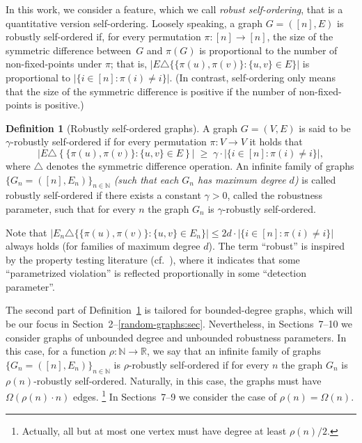 \documentclass[10pt,a4paper]{article}
\theoremstyle{definition}
\newtheorem{definition}[theorem]{Definition}
\newcommand{\N}{\mathbb N}
\newcommand{\R}{\mathbb R}
\newcommand{\BD}{\begin{definition}}   \newcommand{\ED}{\end{definition}}
\begin{document}
In this work, we consider a feature,
which we call {\em robust self-ordering},
that is a quantitative version self-ordering.
%
Loosely speaking, a graph $G=([n],E)$ is robustly self-ordered if,
%
%
for every permutation $\pi:[n]\to[n]$,
the size of the symmetric difference between~$G$ and $\pi(G)$
is proportional to the number of non-fixed-points under $\pi$;
that is, $|E\triangle\{\{\pi(u),\pi(v)\}\!:\!\{u,v\}\!\in\!E\}|$
is proportional to $|\{i\!\in\![n]\!:\!\pi(i)\!\neq\!i\}|$.
(In contrast, self-ordering only means that
the size of the symmetric difference is positive
if the number of non-fixed-points is positive.)

%
\BD[Robustly self-ordered graphs]
\label{robust-asymmetric:def}
A graph $G=(V,E)$ is said to be {\sf $\gamma$-robustly self-ordered}
if for every permutation $\pi:V\to{V}$
it holds that
\begin{equation}\label{robust-asymmetric:eqdef}
\big|E\triangle\left\{\{\pi(u),\pi(v)\}\!:\!\{u,v\}\!\in\!E\right\}\big|
  \;\geq\; \gamma\cdot|\{i\in[n]\!:\!\pi(i)\neq i\}|,
\end{equation}
where $\triangle$ denotes the symmetric difference operation.
An infinite family of graphs $\{G_n=([n],E_n)\}_{n\in\N}$
{\em(such that each $G_n$ has maximum degree $d$)}
is called {\sf robustly self-ordered}
if there exists a constant $\gamma>0$, called the {\sf robustness parameter},
such that for every $n$ the graph $G_n$ is $\gamma$-robustly self-ordered.
\ED
Note that
$|E_n\triangle\{\{\pi(u),\pi(v)\}\!:\!\{u,v\}\!\in\!E_n\}|
 \leq 2d\cdot|\{i\in[n]\!:\!\pi(i)\neq i\}|$
always holds (for families of maximum degree $d$).
%
%
%
%
%
The term ``robust'' is inspired by
the property testing literature (cf.~\cite{RS}),
where it indicates that some ``parametrized violation''
is reflected proportionally in some ``detection parameter''.

The second part of Definition~\ref{robust-asymmetric:def}
is tailored for bounded-degree graphs, which will be our focus
in Section~2--\ref{random-graphs:sec}.
Nevertheless,
in Sections~7--10
we consider graphs
of unbounded degree and unbounded robustness parameters.
In this case, for a function $\rho:\N\to\R$,
we say that an infinite family of graphs $\{G_n=([n],E_n)\}_{n\in\N}$
is {\sf $\rho$-robustly self-ordered} if for every $n$
the graph $G_n$ is $\rho(n)$-robustly self-ordered.
Naturally, in this case, the graphs
must have $\Omega(\rho(n)\cdot n)$ edges.
\footnote{Actually, all but at most one vertex
must have degree at least $\rho(n)/2$.}
%
In Sections~7--9
we consider the case of $\rho(n)=\Omega(n)$.
\end{document}
